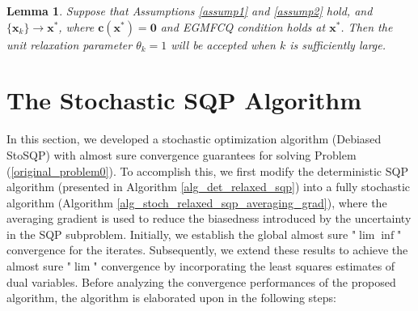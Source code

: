 \documentclass[aos]{imsart}
\numberwithin{equation}{section}
\theoremstyle{plain}
\newtheorem{lemma}{Lemma}
\begin{document}
\begin{lemma}
\label{theorem_local_relaxation_parameter}
    Suppose that Assumptions \ref{assump1} and \ref{assump2} hold, and $\{\bm{x}_k\} \to \bm{x}^{*}$, where $\bm{c}(\bm{x}^{*}) = \bm{0}$ and EGMFCQ condition holds at $\bm{x}^{*}$. Then the unit relaxation parameter $\theta_k = 1$ will be accepted when $k$ is sufficiently large.
\end{lemma}



\section{The Stochastic SQP Algorithm}
\label{sec:relaxed_stochSQP}

In this section, we developed a stochastic optimization algorithm (Debiased StoSQP) with almost sure convergence guarantees for solving Problem (\ref{original_problem0}).  To accomplish this,
we first modify the deterministic SQP algorithm (presented in Algorithm \ref{alg_det_relaxed_sqp}) into a fully stochastic algorithm (Algorithm \ref{alg_stoch_relaxed_sqp_averaging_grad}), where the averaging gradient is used to reduce the biasedness introduced by the uncertainty in the SQP subproblem. 
Initially, we establish the global almost sure "$\lim \inf$" convergence for the iterates. 
Subsequently, we extend these results to achieve the almost sure "$\lim$" convergence by incorporating the least squares estimates of dual variables. Before analyzing the convergence performances of the proposed algorithm, the algorithm is elaborated upon in the following steps:
\end{document}
